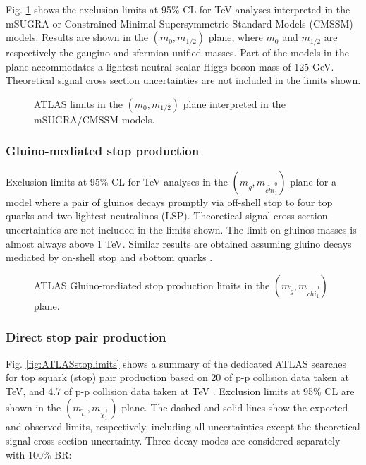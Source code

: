 Fig. \ref{fig:ATLASmsugralimits} shows the exclusion limits at 95\% CL for \cmotto TeV analyses interpreted in the mSUGRA or Constrained Minimal Supersymmetric Standard Models (CMSSM) models. Results are shown in the $(m_0, m_{1/2})$ plane, where  $m_0$ and $m_{1/2}$ are respectively the gaugino and sfermion unified masses. Part of the models in the plane accommodates a lightest neutral scalar Higgs boson mass of 125 GeV. Theoretical signal cross section uncertainties are not included in the limits shown. 
\begin{figure}[h]
\begin{center}
\end{center}
\caption[ATLAS mSUGRA/CMSSM limits]{ATLAS limits in the $(m_0, m_{1/2})$ plane interpreted in the mSUGRA/CMSSM models.}
\label{fig:ATLASmsugralimits}
\end{figure}

\subsubsection{Gluino-mediated stop production}

Exclusion limits at 95\% CL for \cmotto TeV analyses in the $(m_{\tilde{g}}, m_{\tilde{chi}_1^0})$ plane for a model where a pair of gluinos decays promptly via off-shell stop to four top quarks and two lightest neutralinos (LSP). Theoretical signal cross section uncertainties are not included in the limits shown. The limit on gluinos masses is almost always above 1 TeV. Similar results are obtained assuming gluino decays mediated by on-shell stop and sbottom quarks \cite{atlas:strong1} \cite{atlas:strong2}.


\begin{figure}[h]
\begin{center}
\end{center}
\caption[ATLAS Gluino-mediated stop production limits]{ATLAS Gluino-mediated stop production limits in the $(m_{\tilde{g}}, m_{\tilde{chi}_1^0})$ plane.}
\label{fig:ATLASgluinolimits}
\end{figure}

\subsubsection{Direct stop pair production}

Fig. \ref{fig:ATLASstoplimits} shows a summary of the dedicated ATLAS searches for top squark (stop) pair production based on 20 \ifb of p-p collision data taken at \cmotto TeV, and 4.7 \ifb of p-p collision data taken at \cmotto TeV \cite{atlas:stop0lep} \cite{atlas:stop2lep}. Exclusion limits at 95\% CL are shown in the $\left( m_{\tilde{t}_1}, m_{\tilde{\chi}^+_1} \right)$ plane. The dashed and solid lines show the expected and observed limits, respectively, including all uncertainties except the theoretical signal cross section uncertainty. Three decay modes are considered separately with 100\% BR: 

